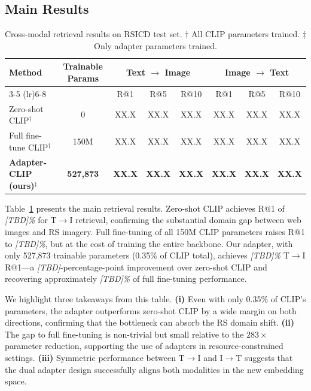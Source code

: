 \documentclass[review,12pt]{elsarticle}
\begin{document}
\subsection{Main Results}
\begin{table}[t]
\centering
\caption{Cross-modal retrieval results on RSICD test set.
         $\dagger$ All CLIP parameters trained. $\ddagger$ Only adapter parameters trained.}
\label{tab:main_results}
\begin{tabular}{lccccccc}
\toprule
\multirow{2}{*}{\textbf{Method}} & \multirow{2}{*}{\textbf{Trainable Params}} &
\multicolumn{3}{c}{\textbf{Text $\rightarrow$ Image}} &
\multicolumn{3}{c}{\textbf{Image $\rightarrow$ Text}} \\
\cmidrule(lr){3-5} \cmidrule(lr){6-8}
& & R@1 & R@5 & R@10 & R@1 & R@5 & R@10 \\
\midrule
Zero-shot CLIP$^\dagger$       & 0      & XX.X & XX.X & XX.X & XX.X & XX.X & XX.X \\
Full fine-tune CLIP$^\dagger$  & 150M   & XX.X & XX.X & XX.X & XX.X & XX.X & XX.X \\
\textbf{Adapter-CLIP (ours)}$^\ddagger$ & \textbf{527,873} & \textbf{XX.X} & \textbf{XX.X} & \textbf{XX.X} & \textbf{XX.X} & \textbf{XX.X} & \textbf{XX.X} \\
\bottomrule
\end{tabular}
\end{table}

Table~\ref{tab:main_results} presents the main retrieval results.
Zero-shot CLIP achieves R@1 of \textit{[TBD]\%} for T$\rightarrow$I retrieval,
confirming the substantial domain gap between web images and RS imagery.
Full fine-tuning of all 150M CLIP parameters raises R@1 to \textit{[TBD]\%},
but at the cost of training the entire backbone. Our adapter, with only
527,873 trainable parameters (0.35\% of CLIP total), achieves
\textit{[TBD]\%} T$\rightarrow$I R@1---a \textit{[TBD]}-percentage-point
improvement over zero-shot CLIP and recovering approximately
\textit{[TBD]\%} of full fine-tuning performance.

We highlight three takeaways from this table.
\textbf{(i)} Even with only 0.35\% of CLIP's parameters, the adapter
outperforms zero-shot CLIP by a wide margin on both directions, confirming
that the bottleneck can absorb the RS domain shift.
\textbf{(ii)} The gap to full fine-tuning is non-trivial but small relative to
the $283\times$ parameter reduction, supporting the use of adapters in
resource-constrained settings.
\textbf{(iii)} Symmetric performance between T$\rightarrow$I and I$\rightarrow$T
suggests that the dual adapter design successfully aligns both modalities
in the new embedding space.
\end{document}
